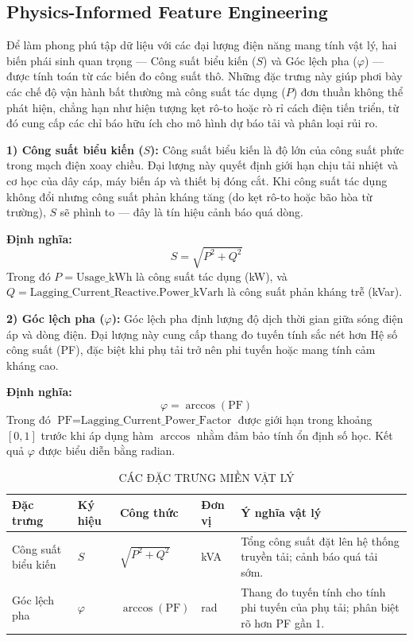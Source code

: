 \documentclass[conference]{IEEEtran}
\begin{document}
\subsection{Physics-Informed Feature Engineering}

Để làm phong phú tập dữ liệu với các đại lượng điện năng mang tính vật lý,
hai biến phái sinh quan trọng --- Công suất biểu kiến ($S$) và Góc lệch pha
($\varphi$) --- được tính toán từ các biến đo công suất thô.
Những đặc trưng này giúp phơi bày các chế độ vận hành bất thường mà công suất tác dụng ($P$) đơn thuần không thể phát hiện,
chẳng hạn như hiện tượng kẹt rô-to hoặc rò rỉ cách điện tiến triển,
từ đó cung cấp các chỉ báo hữu ích cho mô hình dự báo tải và phân loại rủi ro.

\textbf{1) Công suất biểu kiến ($S$):}
Công suất biểu kiến là độ lớn của công suất phức trong mạch điện xoay chiều.
Đại lượng này quyết định giới hạn chịu tải nhiệt và cơ học của dây cáp, máy biến áp và thiết bị đóng cắt.
Khi công suất tác dụng không đổi nhưng công suất phản kháng tăng (do kẹt rô-to hoặc bão hòa từ trường),
$S$ sẽ phình to --- đây là tín hiệu cảnh báo quá dòng.

\textbf{Định nghĩa:}
\begin{equation}
S = \sqrt{P^2 + Q^2}
\label{eq:apparent}
\end{equation}
Trong đó $P = \text{Usage\_kWh}$ là công suất tác dụng (kW),
và $Q = \text{Lagging\_Current\_Reactive.Power\_kVarh}$ là công suất phản kháng trễ (kVar).

\textbf{2) Góc lệch pha ($\varphi$):}
Góc lệch pha định lượng độ dịch thời gian giữa sóng điện áp và dòng điện.
Đại lượng này cung cấp thang đo tuyến tính sắc nét hơn Hệ số công suất (PF),
đặc biệt khi phụ tải trở nên phi tuyến hoặc mang tính cảm kháng cao.

\textbf{Định nghĩa:}
\begin{equation}
\varphi = \arccos(\text{PF})
\label{eq:phase}
\end{equation}
Trong đó $\text{PF} = \text{Lagging\_Current\_Power\_Factor}$ được giới hạn trong khoảng $[0, 1]$
trước khi áp dụng hàm $\arccos$ nhằm đảm bảo tính ổn định số học.
Kết quả $\varphi$ được biểu diễn bằng radian.

\begin{table}[htbp]
\caption{CÁC ĐẶC TRƯNG MIỀN VẬT LÝ}
\label{tab:physical}
\centering
\small
\begin{tabular}{@{}p{3.0cm}p{1.2cm}p{3.0cm}p{1.2cm}p{5.4cm}@{}}
\toprule
Đặc trưng & Ký hiệu & Công thức & Đơn vị & Ý nghĩa vật lý \\
\midrule
Công suất biểu kiến & $S$ & $\sqrt{P^2+Q^2}$ & kVA & Tổng công suất đặt lên hệ thống truyền tải; cảnh báo quá tải sớm. \\
Góc lệch pha & $\varphi$ & $\arccos(\mathrm{PF})$ & rad & Thang đo tuyến tính cho tính phi tuyến của phụ tải; phân biệt rõ hơn PF gần 1. \\
\bottomrule
\end{tabular}
\end{table}
\end{document}
